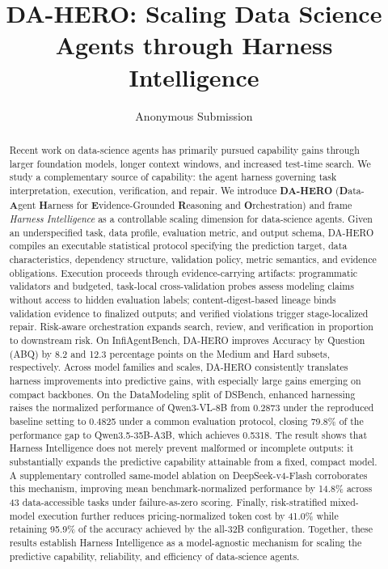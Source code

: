 \documentclass[letterpaper]{article} %
\title{DA-HERO: Scaling Data Science Agents through Harness Intelligence}
\author{
    Anonymous Submission
}
\begin{document}
\maketitle

\begin{abstract}
Recent work on data-science agents has primarily pursued capability gains through larger foundation models, longer context windows, and increased test-time search. We study a complementary source of capability: the agent harness governing task interpretation, execution, verification, and repair. We introduce \textbf{DA-HERO} (\textbf{D}ata-\textbf{A}gent \textbf{H}arness for \textbf{E}vidence-Grounded \textbf{R}easoning and \textbf{O}rchestration) and frame \emph{Harness Intelligence} as a controllable scaling dimension for data-science agents. Given an underspecified task, data profile, evaluation metric, and output schema, DA-HERO compiles an executable statistical protocol specifying the prediction target, data characteristics, dependency structure, validation policy, metric semantics, and evidence obligations. Execution proceeds through evidence-carrying artifacts: programmatic validators and budgeted, task-local cross-validation probes assess modeling claims without access to hidden evaluation labels; content-digest-based lineage binds validation evidence to finalized outputs; and verified violations trigger stage-localized repair. Risk-aware orchestration expands search, review, and verification in proportion to downstream risk. On InfiAgentBench, DA-HERO improves Accuracy by Question (ABQ) by 8.2 and 12.3 percentage points on the Medium and Hard subsets, respectively. Across model families and scales, DA-HERO consistently translates harness improvements into predictive gains, with especially large gains emerging on compact backbones. On the DataModeling split of DSBench, enhanced harnessing raises the normalized performance of Qwen3-VL-8B from 0.2873 under the reproduced baseline setting to 0.4825 under a common evaluation protocol, closing 79.8\% of the performance gap to Qwen3.5-35B-A3B, which achieves 0.5318. The result shows that Harness Intelligence does not merely prevent malformed or incomplete outputs: it substantially expands the predictive capability attainable from a fixed, compact model. A supplementary controlled same-model ablation on DeepSeek-v4-Flash corroborates this mechanism, improving mean benchmark-normalized performance by 14.8\% across 43 data-accessible tasks under failure-as-zero scoring. Finally, risk-stratified mixed-model execution further reduces pricing-normalized token cost by 41.0\% while retaining 95.9\% of the accuracy achieved by the all-32B configuration. Together, these results establish Harness Intelligence as a model-agnostic mechanism for scaling the predictive capability, reliability, and efficiency of data-science agents.
\end{abstract}
\end{document}
